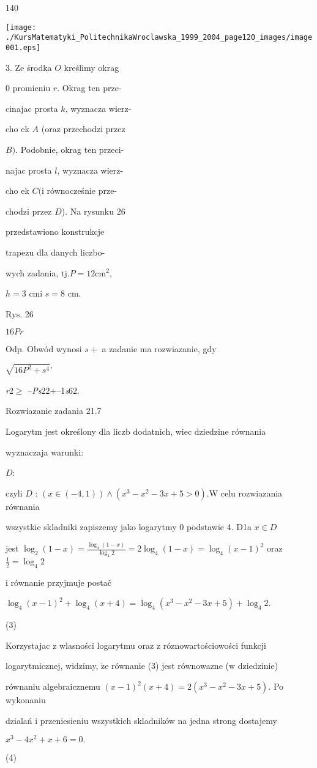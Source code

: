 \documentclass[a4paper,12pt]{article}
\begin{document}
140
\begin{center}
\texttt{[image: ./KursMatematyki\_PolitechnikaWroclawska\_1999\_2004\_page120\_images/image001.eps]}
\end{center}
3. Ze środka $O$ kreślimy okrag

$0$ promieniu $r$. Okrag ten prze-

cinajac prosta $k$, wyznacza wierz-

cho ek $A$ (oraz przechodzi przez

$B)$. Podobnie, okrag ten przeci-

najac prosta $l$, wyznacza wierz-

cho ek $C (\mathrm{i}$ równocześnie prze-

chodzi przez $D$). Na rysunku 26

przedstawiono konstrukcje

trapezu dla danych liczbo-

wych zadania, $\mathrm{t}\mathrm{j}. P = 12 \mathrm{c}\mathrm{m}^{2},$

$h=3$ cmi $s=8$ cm.

$\mathrm{R}\mathrm{y}\mathrm{s}$. 26

$16Pr$

Odp. Obwód wynosi $s+$ a zadanie ma rozwiazanie, gdy

$\sqrt{16P^{2}+s^{4}}$'

{\it r}2$\geq$ --{\it Ps}22$+$--1{\it s}62.

Rozwiazanie zadania 21.7

Logarytm jest określony dla liczb dodatnich, wiec dziedzine równania

wyznaczaja warunki:

$D$: 

czyli $D$ : $(x\in(-4,1))\wedge(x^{3}-x^{2}-3x+5>0). \mathrm{W}$ celu rozwiazania równania

wszystkie skladniki zapiszemy jako logarytmy $0$ podstawie 4. D1a $x \in D$

jest $\displaystyle \log_{2}(1-x)=\frac{\log_{4}(1-x)}{\log_{4}2}=2\log_{4}(1-x)=\log_{4}(x-1)^{2}$ oraz $\displaystyle \frac{1}{2}=\log_{4}2$

$\mathrm{i}$ równanie przyjmuje postač

$\log_{4}(x-1)^{2}+\log_{4}(x+4)=\log_{4}(x^{3}-x^{2}-3x+5)+\log_{4}2.$

(3)

Korzystajac $\mathrm{z}$ wlasności logarytmu oraz $\mathrm{z}$ róznowartościowości funkcji

logarytmicznej, widzimy, $\dot{\mathrm{z}}\mathrm{e}$ równanie (3) jest równowazne ($\mathrm{w}$ dziedzinie)

równaniu algebraicznemu $(x-1)^{2}(x+4)=2(x^{3}-x^{2}-3x+5)$. Po wykonaniu

dzialań $\mathrm{i}$ przeniesieniu wszystkich skladników na jedna strong dostajemy

$x^{3}-4x^{2}+x+6=0.$

(4)
\end{document}
